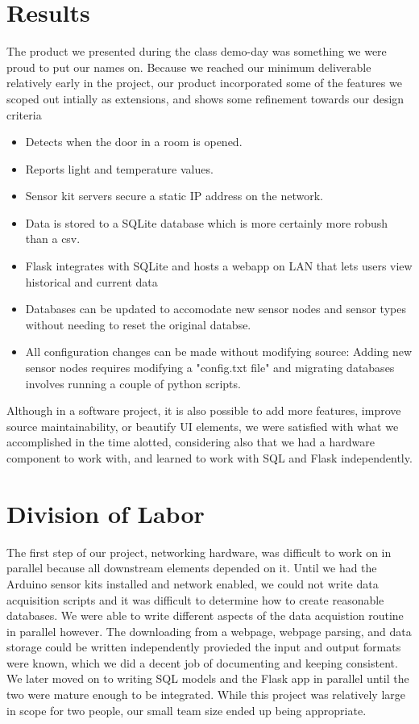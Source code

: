 \documentclass{article}
\begin{document}
\section*{Results}
\par The product we presented during the class demo-day was something we were proud to put our names on. Because we reached our minimum deliverable relatively early in the project, our product incorporated some of the features we scoped out intially as extensions, and shows some refinement towards our design criteria
\begin{itemize}
 \item Detects when the door in a room is opened.
 \item Reports light and temperature values.
 \item Sensor kit servers secure a static IP address on the network.
 \item Data is stored to a SQLite database which is more certainly more robush than a csv.
 \item Flask integrates with SQLite and hosts a webapp on LAN that lets users view historical and current data
 \item Databases can be updated to accomodate new sensor nodes and sensor types without needing to reset the original databse.
 \item All configuration changes can be made without modifying source: Adding new sensor nodes requires modifying a "config.txt file" and migrating databases involves running a couple of python scripts.
\end{itemize}
Although in a software project, it is also possible to add more features, improve source maintainability, or beautify UI elements, we were satisfied with what we accomplished in the time alotted, considering also that we had a hardware component to work with, and learned to work with SQL and Flask independently.

\section*{Division of Labor}
\par The first step of our project, networking hardware, was difficult to work on in parallel because all downstream elements depended on it. Until we had the Arduino sensor kits installed and network enabled, we could not write data acquisition scripts and it was difficult to determine how to create reasonable databases. We were able to write different aspects of the data acquistion routine in parallel however. The downloading from a webpage, webpage parsing, and data storage could be written independently provieded the input and output formats were known, which we did a decent job of documenting and keeping consistent. We later moved on to writing SQL models and the Flask app in parallel until the two were mature enough to be integrated. While this project was relatively large in scope for two people, our small team size ended up being appropriate.
\end{document}
